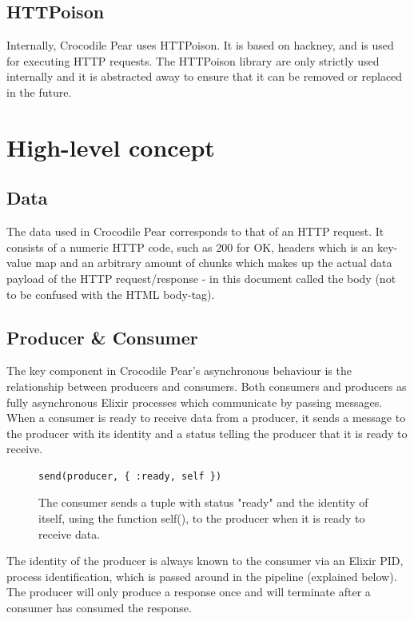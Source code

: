\documentclass{cslthse-msc}
\begin{document}
\subsection{HTTPoison}
Internally, Crocodile Pear uses HTTPoison\cite{httpoison}. It is based on hackney\cite{hackney}, and is used for executing HTTP requests. The HTTPoison library are only strictly used internally and it is abstracted away to ensure that it can be removed or replaced in the future. 

\section{High-level concept}

\subsection{Data}
The data used in Crocodile Pear corresponds to that of an HTTP request. It consists of a numeric HTTP code, such as 200 for OK, headers which is an key-value map and an arbitrary amount of chunks which makes up the actual data payload of the HTTP request/response - in this document called the body (not to be confused with the HTML body-tag).

\subsection{Producer \& Consumer}
The key component in Crocodile Pear's asynchronous behaviour is the relationship between producers and consumers. Both consumers and producers as fully asynchronous Elixir processes which communicate by passing messages. When a consumer is ready to receive data from a producer, it sends a message to the producer with its identity and a status telling the producer that it is ready to receive.

\begin{figure}[H]
  \centering
\begin{lstlisting}[breaklines=true,frame=single]
send(producer, { :ready, self })	
\end{lstlisting}
  \caption{The consumer sends a tuple with status "ready" and the identity of itself, using the function self(), to the producer when it is ready to receive data.}
\end{figure}

The identity of the producer is always known to the consumer via an Elixir PID, process identification, which is passed around in the pipeline (explained below). The producer will only produce a response once and will terminate after a consumer has consumed the response.
\end{document}
